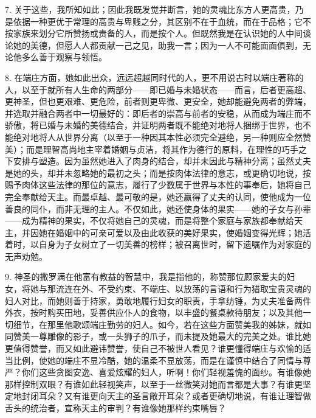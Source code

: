 7. 关于这些，我所知如此；因此我既发觉并断言，她的灵魂比东方人更高贵，乃是依据一种更优于常理的高贵与卑贱之分，其区别不在于血统，而在于品格；它不按家族来划分它所赞扬或责备的人，而是按个人。但既然我是在认识她的人中间谈论她的美德，但愿人人都贡献一己之见，助我一言；因为一人不可能面面俱到，无论他多么善于观察与领悟。\par

8. 在端庄方面，她如此出众，远远超越同时代的人，更不用说古时以端庄著称的人，以至于就所有人生命的两部分——即已婚与未婚状态——而言，后者更高超、更神圣，但也更艰难、更危险，前者则更卑微、更安全，她却能避免两者的弊端，并选取并融合两者中一切最好的：即后者的崇高与前者的安稳，从而成为端庄而不骄傲，将已婚与未婚的美德结合，并证明两者既不能绝对地将人捆绑于世界，也不能绝对地将人从世界分离（以至于一种因其本性必须完全避绝，另一种则应全然赞美）；而是理智高尚地主宰着婚姻与贞洁，将其作为德行的原料，在理性的巧手之下安排与塑造。因为虽然她进入了肉身的结合，却并未因此与精神分离；虽然丈夫是她的头，却并未忽略她的最初之头；而是按肉体法律的意志，或更确切地说，按赐予肉体这些法律的那位的意志，履行了少数属于世界与本性的事奉后，她将自己完全奉献给天主。而最卓越、最可敬的是，她还赢得了丈夫的认同，使他成为一位善良的同仆，而非无理的主人。不仅如此，她还使身体的果实——她的子女与孙辈——成为精神的果实，不仅将她自己的灵魂，而是将整个家庭与家族都奉献给天主，并因她在婚姻中的可亲可爱以及由此收获的美好果实，使婚姻变得光辉；她活着时，以自身为子女树立了一切美善的榜样；被召离世时，留下遗嘱作为对家庭的无声劝勉。\par

9. 神圣的撒罗满在他富有教益的智慧中，我是指他的，称赞那位顾家爱夫的妇女，将她与那流连在外、不受约束、不端庄、以放荡的言语和行为猎取宝贵灵魂的妇人对比，而她则善于持家，勇敢地履行妇女的职责，手拿纺锤，为丈夫准备两件外衣，按时购买田地，妥善供应仆人的食物，以丰盛的餐桌款待朋友；以及其他一切细节，在那里他歌颂端庄勤劳的妇人。如今，若在这些方面赞美我的姊妹，就如同赞美一尊雕像的影子，或一头狮子的爪子，而未提及她最大的完美之处。谁比她更值得赞誉，而又如此避讳赞誉，使自己不被世人看见？谁更懂得端庄与欢愉的适当比例，使她的端庄不显冷酷，她的温柔不显放荡，而是在谨慎中结合了同情与尊严？你们这些贪图安逸、喜爱炫耀的妇人，听啊！你们轻视羞愧的面纱。有谁像她那样控制双眼？有谁如此轻视笑声，以至于一丝微笑对她而言都是大事？有谁更坚定地封闭耳朵？又有谁更向天主的圣言敞开耳朵？或者更确切地说，有谁让理智做舌头的统治者，宣称天主的审判？有谁像她那样约束嘴唇？\par

